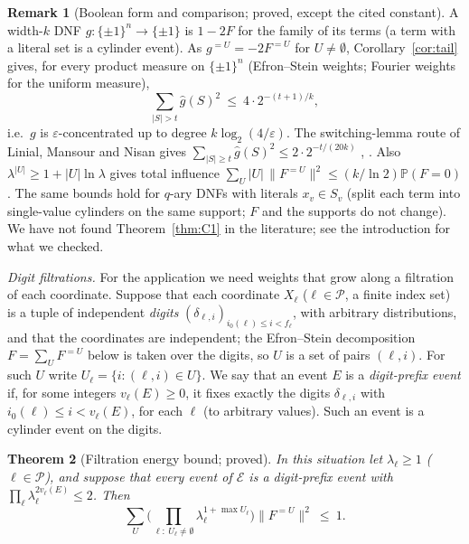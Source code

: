 \documentclass[11pt,reqno]{amsart}
\newtheorem{theorem}{Theorem}[section]
\theoremstyle{definition}
\newtheorem{remark}[theorem]{Remark}
\newcommand{\cE}{\mathcal E}
\newcommand{\cP}{\mathcal P}
\newcommand{\PP}{\mathbb P}
\begin{document}
\begin{remark}[Boolean form and comparison; proved, except the cited constant]\label{rem:boolean}
A width-$k$ DNF $g:\{\pm1\}^n\to\{\pm1\}$ is $1-2F$ for the family of its terms
(a term with a literal set is a cylinder event).  As $g^{=U}=-2F^{=U}$ for
$U\ne\emptyset$, Corollary~\ref{cor:tail} gives, for every product measure on
$\{\pm1\}^n$ (Efron--Stein weights; Fourier weights for the uniform measure),
\[
 \sum_{|S|>t}\hat g(S)^2\ \le\ 4\cdot2^{-(t+1)/k},
\]
i.e.\ $g$ is $\varepsilon$-concentrated up to degree $k\log_2(4/\varepsilon)$.  The
switching-lemma route of Linial, Mansour and Nisan gives
$\sum_{|S|\ge t}\hat g(S)^2\le2\cdot2^{-t/(20k)}$ \cite[\S4.4]{OD}, \cite{LMN}.  Also
$\lambda^{|U|}\ge1+|U|\ln\lambda$ gives total influence
$\sum_U|U|\,\|F^{=U}\|^2\le(k/\ln2)\PP(F=0)$.  The same bounds hold for $q$-ary
DNFs with literals $x_v\in S_v$ (split each term into single-value cylinders
on the same support; $F$ and the supports do not change).  We have not found Theorem~\ref{thm:C1} in the
literature; see the introduction for what we checked.
\end{remark}

\emph{Digit filtrations.}  For the application we need weights that grow
along a filtration of each coordinate.  Suppose that each coordinate
$X_\ell$ ($\ell\in\cP$, a finite index set) is a tuple of independent
\emph{digits} $(\delta_{\ell,i})_{i_0(\ell)\le i<f_\ell}$, with arbitrary distributions,
and that the coordinates are independent; the Efron--Stein decomposition
$F=\sum_UF^{=U}$ below is taken over the digits, so $U$ is a set of pairs
$(\ell,i)$.  For such $U$ write $U_\ell=\{i:(\ell,i)\in U\}$.  We say that an
event $E$ is a \emph{digit-prefix event} if, for some integers $v_\ell(E)\ge0$,
it fixes exactly the digits $\delta_{\ell,i}$ with $i_0(\ell)\le i<v_\ell(E)$, for each
$\ell$ (to arbitrary values).  Such an event is a cylinder event on the digits.

\begin{theorem}[Filtration energy bound; proved]\label{thm:filtration}
In this situation let $\lambda_\ell\ge1$ ($\ell\in\cP$), and suppose that every event
of $\cE$ is a digit-prefix event with $\prod_\ell\lambda_\ell^{2v_\ell(E)}\le2$.  Then
\[
 \sum_U\Big(\prod_{\ell:\ U_\ell\ne\emptyset}\lambda_\ell^{1+\max U_\ell}\Big)\|F^{=U}\|^2\ \le\ 1 .
\]
\end{theorem}
\end{document}
